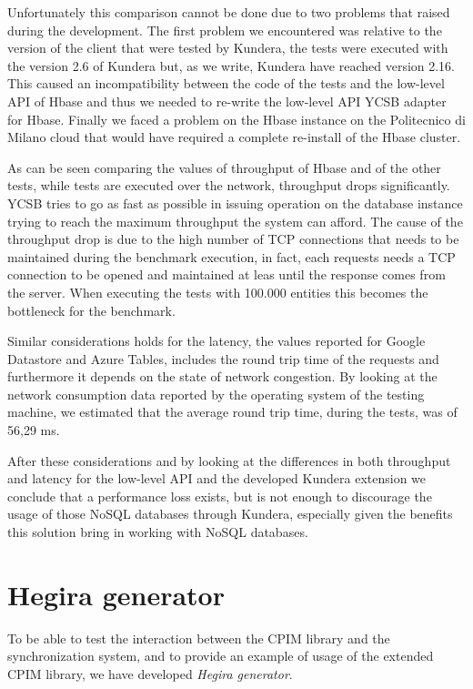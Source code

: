 \noindent Unfortunately this comparison cannot be done due to two problems that raised during the development. The first problem we encountered was relative to the version of the client that were tested by Kundera, the tests were executed with the version 2.6 of Kundera but, as we write, Kundera have reached version 2.16. This caused an incompatibility between the code of the tests and the low-level API of Hbase and thus we needed to re-write the low-level API YCSB adapter for Hbase.
Finally we faced a problem on the Hbase instance on the Politecnico di Milano cloud that would have required a complete re-install of the Hbase cluster.


\newparagraph As can be seen comparing the values of throughput of Hbase and of the other tests, while tests are executed over the network, throughput drops significantly.
YCSB tries to go as fast as possible in issuing operation on the database instance trying to reach the maximum throughput the system can afford. The cause of the throughput drop is due to the high number of TCP connections that needs to be maintained during the benchmark execution, in fact, each requests needs a TCP connection to be opened and maintained at leas until the response comes from the server. When executing the tests with 100.000 entities this becomes the bottleneck for the benchmark.

\noindent Similar considerations holds for the latency, the values reported for Google Datastore and Azure Tables, includes the round trip time of the requests and furthermore it depends on the state of network congestion. By looking at the network consumption data reported by the operating system of the testing machine, we estimated that the average round trip time, during the tests, was of 56,29 ms.

\newparagraph After these considerations and by looking at the differences in both throughput and latency for the low-level API and the developed Kundera extension we conclude that a performance loss exists, but is not enough to discourage the usage of those NoSQL databases through Kundera, especially given the benefits this solution bring in working with NoSQL databases.

\section{Hegira generator}
\label{sec:data}
To be able to test the interaction between the CPIM library and the synchronization system, and to provide an example of usage of the extended CPIM library, we have developed \textit{Hegira generator}.


